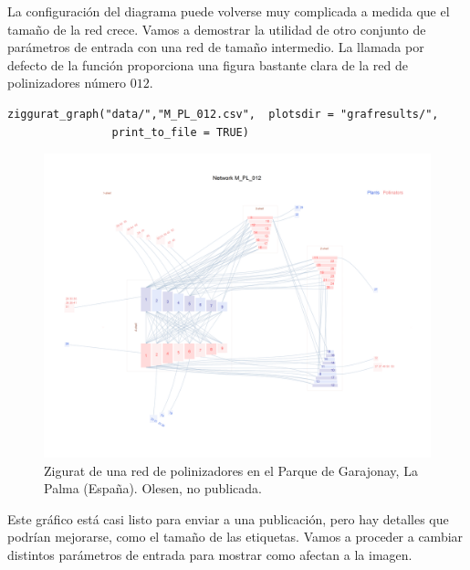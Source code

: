 \clearpage
La configuración del diagrama puede volverse muy complicada a medida que el tamaño de la red crece. Vamos a demostrar la
utilidad de otro conjunto de parámetros de entrada con una red de tamaño intermedio. La llamada por defecto de la función
proporciona una figura bastante clara de la red de polinizadores número $012$.

\fontsize{3.5mm}{3.5mm}\selectfont
\begin{verbatim}
ziggurat_graph("data/","M_PL_012.csv",  plotsdir = "grafresults/", 
                print_to_file = TRUE)
\end{verbatim}
\normalsize

\begin{figure}[hp!]
\centering
\includegraphics[scale=0.45]{ManFigs/M_PL_012_ziggurat.png}
\caption {Zigurat de una red de polinizadores en el Parque de Garajonay, La Palma (España). Olesen, no publicada.}
\label{fig:AKMAN_ziggurat_012}
\end{figure}

Este gráfico está casi listo para enviar a una publicación, pero hay detalles que podrían mejorarse, como el tamaño
de las etiquetas. Vamos a proceder a cambiar distintos parámetros de entrada para mostrar como afectan a la imagen.

